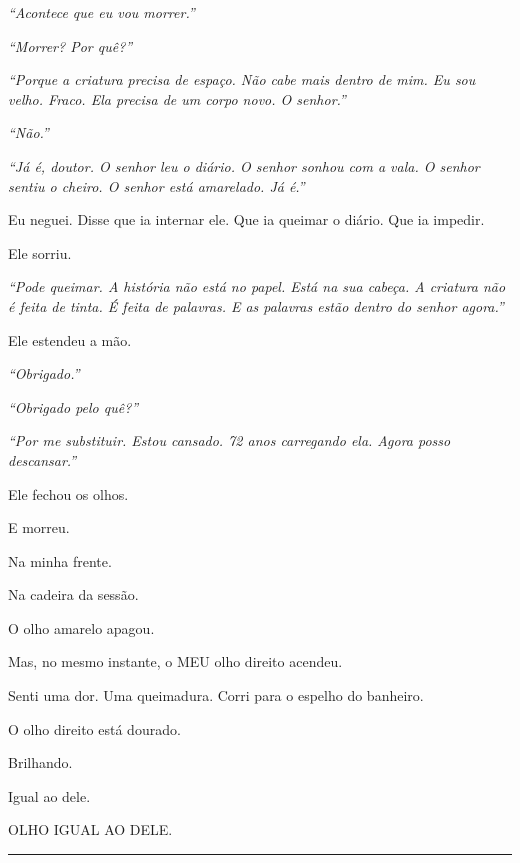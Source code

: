 \noindent \textit{\textquotedblleft{}Acontece que eu vou morrer.\textquotedblright{}}

\noindent \textit{\textquotedblleft{}Morrer? Por quê?\textquotedblright{}}

\noindent \textit{\textquotedblleft{}Porque a criatura precisa de espaço. Não cabe mais dentro de mim. Eu sou velho. Fraco. Ela precisa de um corpo novo. O senhor.\textquotedblright{}}

\noindent \textit{\textquotedblleft{}Não.\textquotedblright{}}

\noindent \textit{\textquotedblleft{}Já é, doutor. O senhor leu o diário. O senhor sonhou com a vala. O senhor sentiu o cheiro. O senhor está amarelado. Já é.\textquotedblright{}}

\noindent Eu neguei. Disse que ia internar ele. Que ia queimar o diário. Que ia impedir.

\noindent Ele sorriu.

\noindent \textit{\textquotedblleft{}Pode queimar. A história não está no papel. Está na sua cabeça. A criatura não é feita de tinta. É feita de palavras. E as palavras estão dentro do senhor agora.\textquotedblright{}}

\noindent Ele estendeu a mão.

\noindent \textit{\textquotedblleft{}Obrigado.\textquotedblright{}}

\noindent \textit{\textquotedblleft{}Obrigado pelo quê?\textquotedblright{}}

\noindent \textit{\textquotedblleft{}Por me substituir. Estou cansado. 72 anos carregando ela. Agora posso descansar.\textquotedblright{}}

\noindent Ele fechou os olhos.

\noindent E morreu.

\noindent Na minha frente.

\noindent Na cadeira da sessão.

\noindent O olho amarelo apagou.

\noindent Mas, no mesmo instante, o MEU olho direito acendeu.

\noindent Senti uma dor. Uma queimadura. Corri para o espelho do banheiro.

\noindent O olho direito está dourado.

\noindent Brilhando.

\noindent Igual ao dele.

\noindent OLHO IGUAL AO DELE.

\vspace{0.5em}\noindent\rule{\textwidth}{0.5pt}\vspace{0.5em}

